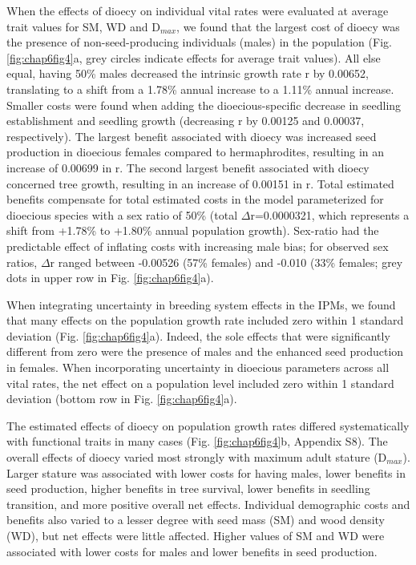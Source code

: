 \documentclass[b5paper,justified]{tufte-book} %
\begin{document}
\begin{fullwidth}
When the effects of dioecy on individual vital rates were evaluated at average trait values for SM, WD and D$_{max}$, we found that the largest cost of dioecy was the presence of non-seed-producing individuals (males) in the population (Fig. \ref{fig:chap6fig4}a, grey circles indicate effects for average trait values). All else equal, having 50\% males decreased the intrinsic growth rate r by 0.00652, translating to a shift from a 1.78\% annual increase to a 1.11\% annual increase. Smaller costs were found when adding the dioecious-specific decrease in seedling establishment and seedling growth (decreasing r by 0.00125 and 0.00037, respectively). The largest benefit associated with dioecy was increased seed production in dioecious females compared to hermaphrodites, resulting in an increase of 0.00699 in r. The second largest benefit associated with dioecy concerned tree growth, resulting in an increase of 0.00151 in r. Total estimated benefits compensate for total estimated costs in the model parameterized for dioecious species with a sex ratio of 50\% (total $\Delta$r=0.0000321, which represents a shift from +1.78\% to +1.80\% annual population growth). Sex-ratio had the predictable effect of inflating costs with increasing male bias; for observed sex ratios, $\Delta$r ranged between -0.00526 (57\% females) and -0.010 (33\% females; grey dots in upper row in Fig. \ref{fig:chap6fig4}a).

When integrating uncertainty in breeding system effects in the IPMs, we found that many effects on the population growth rate included zero within 1 standard deviation (Fig. \ref{fig:chap6fig4}a). Indeed, the sole effects that were significantly different from zero were the presence of males and the enhanced seed production in females. When incorporating uncertainty in dioecious parameters across all vital rates, the net effect on a population level included zero within 1 standard deviation (bottom row in Fig. \ref{fig:chap6fig4}a).

The estimated effects of dioecy on population growth rates differed systematically with functional traits in many cases (Fig. \ref{fig:chap6fig4}b, Appendix S8). The overall effects of dioecy varied most strongly with maximum adult stature (D$_{max}$). Larger stature was associated with lower costs for having males, lower benefits in seed production, higher benefits in tree survival, lower benefits in seedling transition, and more positive overall net effects. Individual demographic costs and benefits also varied to a lesser degree with seed mass (SM) and wood density (WD), but net effects were little affected.  Higher values of SM and WD were associated with lower costs for males and lower benefits in seed production.



\end{fullwidth}
\end{document}
